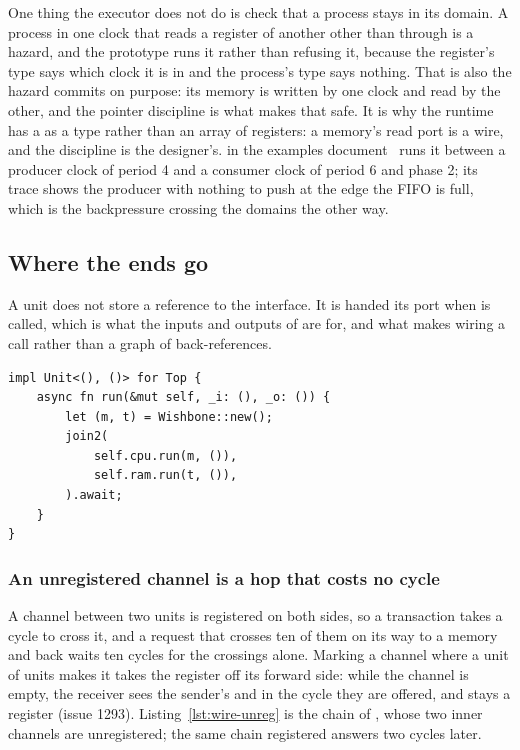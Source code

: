 One thing the executor does not do is check that a process stays in
its domain. A process in one clock that reads a register of another
other than through  is a hazard, and the prototype runs
it rather than refusing it, because the register's type says which
clock it is in and the process's type says nothing. That is also the
hazard  commits on purpose: its memory is written by one
clock and read by the other, and the pointer discipline is what makes
that safe. It is why the runtime has a  as a type
rather than an array of registers: a memory's read port is a wire, and
the discipline is the designer's.  in the examples
document~\cite{examples} runs it between a producer clock of period 4
and a consumer clock of period 6 and phase 2; its trace shows the
producer with nothing to push at the edge the FIFO is full, which is
the backpressure crossing the domains the other way.

\subsection{Where the ends go}

A unit does not store a reference to the interface. It is handed its port
when  is called, which is what the inputs and outputs of
 are for, and what makes wiring a call rather than a graph of
back-references.

\begin{lstlisting}[caption={The parent creates the interface and hands each child the end it takes.},label={lst:wire-up}]
impl Unit<(), ()> for Top {
    async fn run(&mut self, _i: (), _o: ()) {
        let (m, t) = Wishbone::new();
        join2(
            self.cpu.run(m, ()),
            self.ram.run(t, ()),
        ).await;
    }
}
\end{lstlisting}

\subsubsection{An unregistered channel is a hop that costs no cycle}

A channel between two units is registered on both sides, so a
transaction takes a cycle to cross it, and a request that crosses ten
of them on its way to a memory and back waits ten cycles for the
crossings alone. Marking a channel \code{\#[unregistered]} where a
unit of units makes it takes the register off its forward side: while
the channel is empty, the receiver sees the sender's  and
 in the cycle they are offered, and  stays a
register (issue 1293). Listing~\ref{lst:wire-unreg} is the chain of
, whose two inner channels are unregistered; the same
chain registered answers two cycles later.


